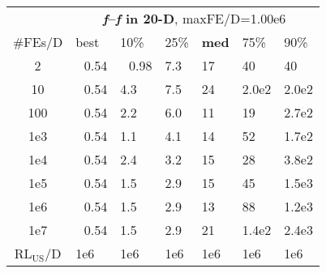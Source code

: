 \begin{tabular}{c|llllll}
 & \multicolumn{6}{|c}{\textbf{\textit{f}\raisebox{-0.35ex}{1}--\textit{f}\raisebox{-0.35ex}{24} in 20-D}, maxFE/D=1.00e6}\\
\#FEs/D & best & 10\% & 25\% & \textbf{med} & 75\% & 90\%\\
2 & ~\,0.54 & ~\,0.98 & \hspace*{1ex}7.3 & 17 & 40 & 40\\
10 & ~\,0.54 & \hspace*{1ex}4.3 & \hspace*{1ex}7.5 & 24 & 2.0e2 & 2.0e2\\
100 & ~\,0.54 & \hspace*{1ex}2.2 & \hspace*{1ex}6.0 & 11 & 19 & 2.7e2\\
1e3 & ~\,0.54 & \hspace*{1ex}1.1 & \hspace*{1ex}4.1 & 14 & 52 & 1.7e2\\
1e4 & ~\,0.54 & \hspace*{1ex}2.4 & \hspace*{1ex}3.2 & 15 & 28 & 3.8e2\\
1e5 & ~\,0.54 & \hspace*{1ex}1.5 & \hspace*{1ex}2.9 & 15 & 45 & 1.5e3\\
1e6 & ~\,0.54 & \hspace*{1ex}1.5 & \hspace*{1ex}2.9 & 13 & 88 & 1.2e3\\
1e7 & ~\,0.54 & \hspace*{1ex}1.5 & \hspace*{1ex}2.9 & 21 & 1.4e2 & 2.4e3\\
$\text{RL}_{\text{US}}$/D & 1e6 & 1e6 & 1e6 & 1e6 & 1e6 & 1e6
\end{tabular}
